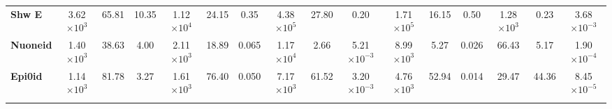 \begin{landscape}
\begin{table}[!hb]
\begin{tabular}{|l|ccc|ccc|ccc|ccc|ccc|}
\textbf{Shw E}      & 3.62$\times 10^3$           & 65.81                                                               & 10.35                                      & 1.12$\times 10^4$             & 24.15                                                                 & 0.35                                         & 4.38$\times 10^5$              & 27.80                                                                  & 0.20                                          & 1.71$\times 10^5$          & 16.15                                                              & 0.50                                      & 1.28$\times 10^3$             & 0.23                                                                  & 3.68$\times 10^{-3}$                                     \\
\textbf{Nuoneid}      & 1.40$\times 10^3$           & 38.63                                                               & 4.00                                       & 2.11$\times 10^3$             & 18.89                                                                 & 0.065                                        & 1.17$\times 10^4$              & 2.66                                                                   & 5.21$\times 10^{-3}$                                      & 8.99$\times 10^3$          & 5.27                                                               & 0.026                                     & 66.43                & 5.17                                                                  & 1.90$\times 10^{-4}$                                     \\
\textbf{Epi0id}       & 1.14$\times 10^3$           & 81.78                                                               & 3.27                                       & 1.61$\times 10^3$             & 76.40                                                                 & 0.050                                        & 7.17$\times 10^3$              & 61.52                                                                  & 3.20$\times 10^{-3}$                                      & 4.76$\times 10^3$          & 52.94                                                              & 0.014                                     & 29.47                & 44.36                                                                 & 8.45$\times 10^{-5}$                                     \\
\rowcolor[HTML]{67FD9A}

\end{tabular}
\end{table}
\end{landscape}
